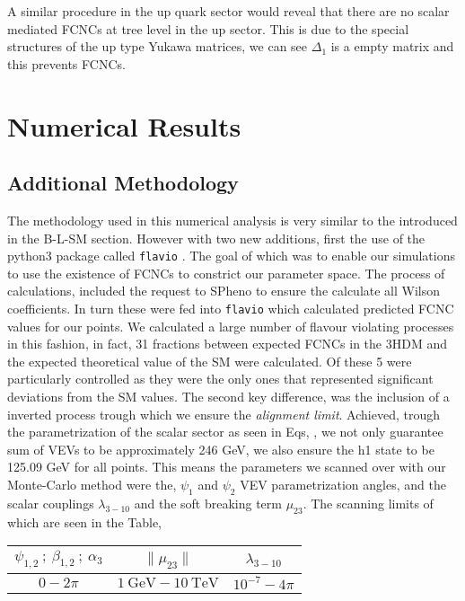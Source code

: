 A similar procedure in the up quark sector would reveal that there are no scalar mediated FCNCs at tree level in
the up sector. 
%
This is due to the special structures of the up type Yukawa matrices, we can see $\Delta_1$ is a empty matrix and this prevents FCNCs.

\section{Numerical Results}

\subsection{Additional Methodology}

The methodology used in this numerical analysis is very similar to the introduced in the B-L-SM section. However with two new additions, first the use of the python3 package called \texttt{flavio} \cite{straub2018flavio}.
%
The goal of which was to enable our simulations to use the existence of FCNCs to constrict our parameter space. 
%
The process of calculations, included the request to SPheno to ensure the calculate all Wilson coefficients. 
%
In turn these were fed into \texttt{flavio} which calculated predicted FCNC values for our points.  
% 
We calculated a large number of flavour violating processes in this fashion, in fact, 31 fractions between expected FCNCs in the 3HDM and the expected theoretical value of the SM were calculated. 
%
Of these 5 were particularly controlled as they were the only ones that represented significant deviations from the SM values.  
% 
The second key difference, was the inclusion of a inverted process trough which we ensure the \textit{alignment limit}.
%
Achieved, trough the parametrization of the scalar sector as seen in Eqs, , we not only guarantee sum of VEVs to be approximately 246 GeV, we also ensure the h1 state to be 125.09 GeV for all points.
% 
This means the parameters we scanned over with our Monte-Carlo method were the, $\psi_1$ and $\psi_2$ VEV parametrization angles, and the scalar couplings $\lambda_{3-10}$ and the soft breaking term $\mu_{23}$. The scanning limits of which are seen in the Table,

\begin{table}[H]
\centering
\begin{tabular}{ccc}
$\psi_{1,2} \ ; \ \beta_{1,2} \ ;\  \alpha_3 $ & $\|\mu_{23}\|$ & $\lambda_{3-10}$ \\ \hline
$0- 2\pi$    & $1 \ \text{GeV} - 10 \ \text{TeV}$                                 & $10^{-7} - 4\pi$      
\end{tabular}
\end{table}

